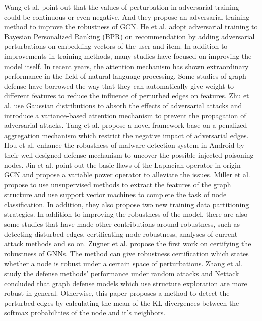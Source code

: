 Wang et al. \cite{wang2019graphdefense} point out that the values of perturbation in adversarial training could be continuous or even negative. And they propose an adversarial training method to improve the robustness of GCN.
He et al. \cite{he2018adversarial} adopt adversarial training to Bayesian Personalized Ranking (BPR) \cite{rendle2009bpr} on recommendation by adding adversarial perturbations on embedding vectors of the user and item.
In addition to improvements in training methods, many studies have focused on improving the model itself. In recent years, the attention mechanism \cite{vaswani2017attention} has shown extraordinary performance in the field of natural language processing. Some studies of graph defense have borrowed the way that they can automatically give weight to different features to reduce the influence of perturbed edges on features.
Zhu et al. \cite{zhu2019robust} use Gaussian distributions to absorb the effects of adversarial attacks and introduce a variance-based attention mechanism to prevent the propagation of adversarial attacks.
Tang et al. \cite{tang2019robust} propose a novel framework base on a penalized aggregation mechanism which restrict the negative impact of adversarial edges.
Hou et al. \cite{hou2019alphacyber} enhance the robustness of malware detection system in Android by their well-designed defense mechanism to uncover the possible injected poisoning nodes.
Jin et al. \cite{jin2019power} point out the basic flaws of the Laplacian operator in origin GCN and propose a variable power operator to alleviate the issues.
Miller et al. \cite{miller2019improving} propose to use unsupervised methods to extract the features of the graph structure and use support vector machines to complete the task of node classification. In addition, they also propose two new training data partitioning strategies.
In addition to improving the robustness of the model, there are also some studies that have made other contributions around robustness, such as detecting disturbed edges, certificating node robustness, analyses of current attack methods and so on.
Z\"ugner et al. \cite{zugner2019certifiable} propose the first work on certifying the robustness of GNNs. The method can give robustness certification which states whether a node is robust under a certain space of perturbations.
Zhang et al. \cite{zhang2019comparing} study the defense methods' performance under random attacks and Nettack concluded that graph defense models which use structure exploration are more robust in general. Otherwise, this paper proposes a method to detect the perturbed edges by calculating the mean of the KL divergences \cite{kullback1951information} between the softmax probabilities of the node and it's neighbors.
